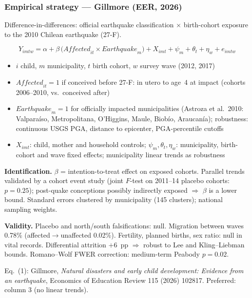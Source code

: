 \documentclass[aspectratio=169,10pt]{beamer}
\begin{document}
\begin{frame}
\frametitle{Empirical strategy --- Gillmore (EER, 2026)}
{\footnotesize Difference-in-differences: official earthquake classification
$\times$ birth-cohort exposure to the 2010 Chilean earthquake (27-F).}

\vspace{2mm}
\begin{equation*}
Y_{imtw}=\alpha+\beta\,\bigl(\mathit{Affected}_{it}\times \mathit{Earthquake}_{m}\bigr)
+X_{imt}+\psi_{m}+\theta_{t}+\eta_{w}+e_{imtw}
\tag{1}
\end{equation*}

\vspace{1mm}
\begin{itemize}\setlength\itemsep{1.5pt}\footnotesize
  \item $i$ child, $m$ municipality, $t$ birth cohort, $w$ survey wave (2012, 2017)
  \item $\mathit{Affected}_{it}=1$ if conceived before 27-F: in utero to age~4
        at impact (cohorts 2006--2010, vs.\ conceived after)
  \item $\mathit{Earthquake}_{m}=1$ for officially impacted municipalities
        (Astroza et al.\ 2010: Valpara\'iso, Metropolitana, O'Higgins, Maule,
        Biob\'io, Araucan\'ia); robustness: continuous USGS PGA, distance to
        epicenter, PGA-percentile cutoffs
  \item $X_{imt}$: child, mother and household controls;
        $\psi_{m},\theta_{t},\eta_{w}$: municipality, birth-cohort and wave
        fixed effects; municipality linear trends as robustness
\end{itemize}

\vspace{2mm}
{\footnotesize \textbf{Identification.} $\beta$ = intention-to-treat effect on
exposed cohorts. Parallel trends validated by a cohort event study (joint
$F$-test on 2011--14 placebo cohorts: $p=0.25$); post-quake conceptions
possibly indirectly exposed $\Rightarrow$ $\beta$ is a lower bound. Standard
errors clustered by municipality (145 clusters); national sampling weights.}

\vspace{1.5mm}
{\footnotesize \textbf{Validity.} Placebo and north/south falsifications: null.
Migration between waves 0.78\%
(affected$\rightarrow$unaffected 0.02\%). Fertility, planned births, sex ratio: null in vital records. Differential attrition $+6$~pp $\Rightarrow$
robust to Lee and Kling--Liebman bounds. Romano--Wolf FWER correction:
medium-term Peabody $p=0.02$.}

\vfill
{\tiny Eq.\ (1): Gillmore, \emph{Natural disasters and early child
development: Evidence from an earthquake}, Economics of Education Review 115
(2026) 102817. Preferred: column 3 (no linear trends).}
\end{frame}
\end{document}
